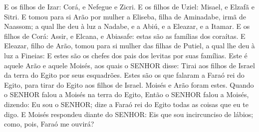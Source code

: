 {E os filhos de Izar: Corá, e Nefegue e Zicri.
E os filhos de Uziel: Misael, e Elzafã e Sitri.
E tomou para si Arão por mulher a Eliseba, filha de Aminadabe, irmã de Naassom; a qual lhe deu à luz a Nadabe, e a Abiú, e a Eleazar, e a Itamar.
E os filhos de Corá: Assir, e Elcana, e Abiasafe: estas são as famílias dos coraítas.
E Eleazar, filho de Arão, tomou para si mulher das filhas de Putiel, a qual lhe deu à luz a Fineias: E estes são os chefes dos pais dos levitas por suas famílias.
Este é aquele Arão e aquele Moisés, aos quais o SENHOR disse: Tirai aos filhos de Israel da terra do Egito por seus esquadrões.
Estes são os que falaram a Faraó rei do Egito, para tirar do Egito aos filhos de Israel. Moisés e Arão foram estes.
Quando o SENHOR falou a Moisés na terra do Egito,
Então o SENHOR falou a Moisés, dizendo: Eu sou o SENHOR; dize a Faraó rei do Egito todas as coisas que eu te digo.
E Moisés respondeu diante do SENHOR: Eis que sou incircunciso de lábios; como, pois, Faraó me ouvirá?

}
